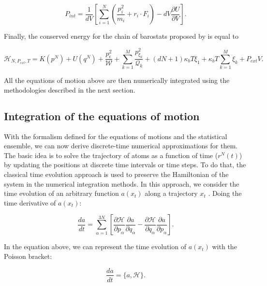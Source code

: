 \begin{equation}
P_{int} = \frac{1}{dV} \left[\sum_{i=1}^{N} \left(\frac{p_{i}^2}{m_i} + r_{i}\cdot F_i \right) - dV \frac{\partial U}{\partial V}\right].
\end{equation}


Finally, the conserved energy for the chain of barostats proposed by  is equal to

\begin{equation}
\mathcal{H}_{N,P_{ext},T} =  K(p^{N}) + U(q^{N})  + \frac{p_{\epsilon}^2}{\mathcal{W}}+\sum_{k=1}^{M }\frac{p^{2}_{\xi _{k}}}{\mathcal{Q} _{k}} + (dN+1)\kappa_{b}T \xi _{1}  + \kappa_{b}T\sum_{k=1}^{M}  \xi _{k} + P_{ext}V.
\end{equation}

All the equations of motion above are then numerically integrated  using the methodologies described in the next section.

\subsection{Integration of the equations of motion}

With the formalism defined for the equations of motions and the statistical ensemble, we can now derive discrete-time numerical approximations for them.  The basic idea is to solve the trajectory of atoms as a function of time ($r^{N}(t)$) by updating the positions at discrete time intervals or time steps. To do that, the classical time evolution approach is used to preserve the Hamiltonian of the system in the numerical integration methods. In this approach, we consider the time evolution of an arbitrary function $a(x_{t})$ along a trajectory $x_{t}$ \cite{tuckerman}. Doing the time derivative of $a(x_{t})$:

\begin{equation}
\frac{da}{dt} = \sum_{\alpha=1}^{3N} \left [  \dfrac{\partial \mathcal{H}}{\partial p_{\alpha}}\dfrac{\partial a}{\partial q_{\alpha}}  -  \dfrac{\partial \mathcal{H}}{\partial q_{\alpha}} \dfrac{\partial a}{\partial p_{\alpha}} \right].
\label{eqn:operador}
\end{equation}

In the equation above, we can represent the time evolution of $a(x_{t})$ with  the Poisson bracket:

\begin{equation}
\frac{da}{dt} = \{a,\mathcal{H}\}.
\end{equation}

